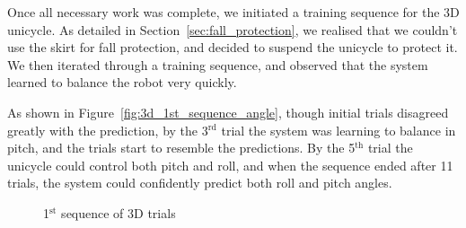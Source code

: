 \documentclass{IIBproject}
\begin{document}
Once all necessary work was complete, we initiated a training sequence for the
3D unicycle. As detailed in Section~\ref{sec:fall_protection}, we realised
that we couldn't use the skirt for fall protection, and decided to suspend the
unicycle to protect it. We then iterated through a training sequence, and
observed that the system learned to balance the robot very quickly.

As shown in Figure~\ref{fig:3d_1st_sequence_angle}, though initial trials
disagreed greatly with the prediction, by the 3$^\textrm{rd}$ trial the system
was learning to balance in pitch, and the trials start to resemble the
predictions. By the 5$^\textrm{th}$ trial the unicycle could control both
pitch and roll, and when the sequence ended after 11 trials, the system could
confidently predict both roll and pitch angles.

\begin{figure}[htpb]
  \begin{center}
    \end{center}
    \caption{1$^\textrm{st}$ sequence of 3D trials}
    \label{fig:3d_1st_sequence}
    \end{figure}
\end{document}
